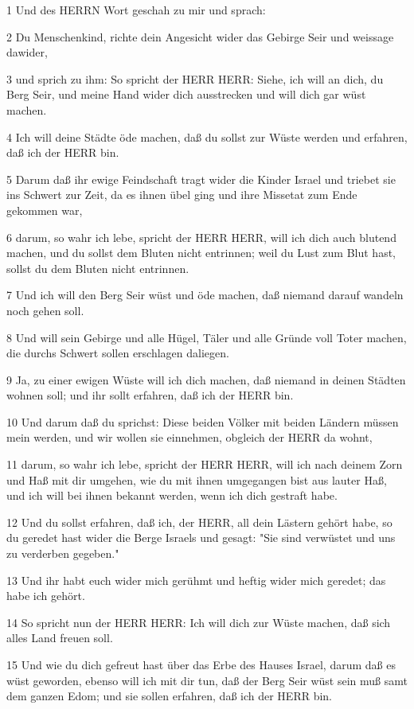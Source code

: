 \par 1 Und des HERRN Wort geschah zu mir und sprach:
\par 2 Du Menschenkind, richte dein Angesicht wider das Gebirge Seir und weissage dawider,
\par 3 und sprich zu ihm: So spricht der HERR HERR: Siehe, ich will an dich, du Berg Seir, und meine Hand wider dich ausstrecken und will dich gar wüst machen.
\par 4 Ich will deine Städte öde machen, daß du sollst zur Wüste werden und erfahren, daß ich der HERR bin.
\par 5 Darum daß ihr ewige Feindschaft tragt wider die Kinder Israel und triebet sie ins Schwert zur Zeit, da es ihnen übel ging und ihre Missetat zum Ende gekommen war,
\par 6 darum, so wahr ich lebe, spricht der HERR HERR, will ich dich auch blutend machen, und du sollst dem Bluten nicht entrinnen; weil du Lust zum Blut hast, sollst du dem Bluten nicht entrinnen.
\par 7 Und ich will den Berg Seir wüst und öde machen, daß niemand darauf wandeln noch gehen soll.
\par 8 Und will sein Gebirge und alle Hügel, Täler und alle Gründe voll Toter machen, die durchs Schwert sollen erschlagen daliegen.
\par 9 Ja, zu einer ewigen Wüste will ich dich machen, daß niemand in deinen Städten wohnen soll; und ihr sollt erfahren, daß ich der HERR bin.
\par 10 Und darum daß du sprichst: Diese beiden Völker mit beiden Ländern müssen mein werden, und wir wollen sie einnehmen, obgleich der HERR da wohnt,
\par 11 darum, so wahr ich lebe, spricht der HERR HERR, will ich nach deinem Zorn und Haß mit dir umgehen, wie du mit ihnen umgegangen bist aus lauter Haß, und ich will bei ihnen bekannt werden, wenn ich dich gestraft habe.
\par 12 Und du sollst erfahren, daß ich, der HERR, all dein Lästern gehört habe, so du geredet hast wider die Berge Israels und gesagt: "Sie sind verwüstet und uns zu verderben gegeben."
\par 13 Und ihr habt euch wider mich gerühmt und heftig wider mich geredet; das habe ich gehört.
\par 14 So spricht nun der HERR HERR: Ich will dich zur Wüste machen, daß sich alles Land freuen soll.
\par 15 Und wie du dich gefreut hast über das Erbe des Hauses Israel, darum daß es wüst geworden, ebenso will ich mit dir tun, daß der Berg Seir wüst sein muß samt dem ganzen Edom; und sie sollen erfahren, daß ich der HERR bin.

